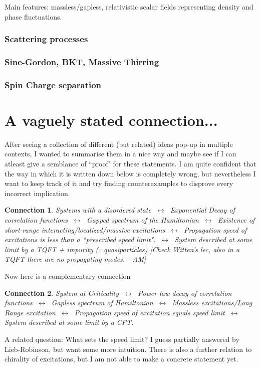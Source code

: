 \documentclass{article}
\newcommand\AM[1]{{\it \color{darkblue}  [#1 - AM]}}
\newtheorem{conn}{Connection}
\begin{document}
Main features: massless/gapless, relativistic scalar fields representing density and phase fluctuations.
\subsubsection{Scattering processes}
\subsubsection{Sine-Gordon, BKT, Massive Thirring}
\subsubsection{Spin Charge separation}
\section{A vaguely stated connection...}
After seeing a collection of different (but related) ideas pop-up in multiple contexts, I wanted to summarise them in a nice way and maybe see if I can atleast give a semblance of ``proof" for these statements. I am quite confident that the way in which it is written down below is completely wrong, but nevertheless I want to keep track of it and try finding counterexamples to disprove every incorrect implication.

\begin{conn}
    Systems with a disordered state $~\longleftrightarrow~$ Exponential Decay of correlation functions 
    $~\longleftrightarrow~$ Gapped spectrum of the Hamiltonian
    $~\longleftrightarrow~$ Existence of short-range interacting/localized/massive excitations
    $~\longleftrightarrow~$ Propagation speed of excitations is less than a ``prescribed speed limit".
    $~\longleftrightarrow~$ System described at some limit by a TQFT + impurity (=quasiparticles) \AM{Check Witten's lec, also in a TQFT there are no propagating modes.}
\end{conn}

Now here is a complementary connection
\begin{conn}
    System at Criticality 
    $~\longleftrightarrow~$ Power law decay of correlation functions
    $~\longleftrightarrow~$ Gapless spectrum of Hamiltonian
    $~\longleftrightarrow~$ Massless excitations/Long Range excitation
    $~\longleftrightarrow~$ Propagation speed of excitation equals speed limit
    $~\longleftrightarrow~$ System described at some limit by a CFT.
\end{conn}
A related question: What sets the speed limit? I guess partially answered by Lieb-Robinson, but want some more intuition. There is also a further relation to chirality of excitations, but I am not able to make a concrete statement yet.
\end{document}
